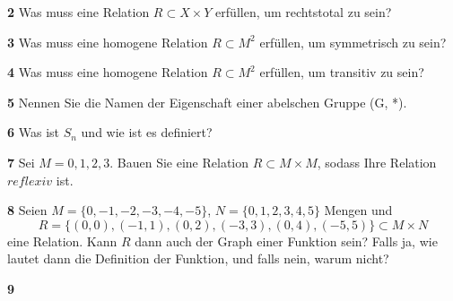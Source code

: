 \documentclass[11pt]{article}
\begin{document}
    \textbf{2} Was muss eine Relation \( R \subset X \times Y \) erfüllen, um rechtstotal zu sein?

    \textbf{3} Was muss eine homogene Relation \( R \subset M^2 \) erfüllen, um symmetrisch zu sein?

    \textbf{4} Was muss eine homogene Relation \( R \subset M^2 \) erfüllen, um transitiv zu sein?

    \textbf{5} Nennen Sie die Namen der Eigenschaft einer abelschen Gruppe (G, *).

    \textbf{6} Was ist $S_n$ und wie ist es definiert?

    \textbf{7} Sei $M = {0,1,2,3}$. Bauen Sie eine Relation $R \subset M \times M$, sodass Ihre Relation $reflexiv$ ist.

    \textbf{8} Seien \( M = \{0,-1,-2,-3,-4,-5\} \), \( N = \{0,1,2,3,4,5\} \) Mengen und
    \[ R = \{(0,0),(-1,1),(0,2),(-3,3),(0,4),(-5,5)\} \subset M \times N \]
    eine Relation. Kann \( R \) dann auch der Graph einer Funktion sein? Falls ja, wie lautet dann die Definition der Funktion, und falls nein, warum nicht?

    \textbf{9}
\end{document}
